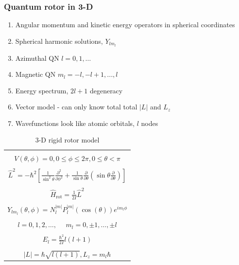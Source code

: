 \documentclass[11pt]{article}
\begin{document}
\subsubsection{Quantum rotor in 3-D}
\label{sec:org6f3d04d}
\begin{enumerate}
\item Angular momentum and kinetic energy operators in spherical coordinates
\item Spherical harmonic solutions, \(Y_{lm_l}\)
\item Azimuthal QN \(l=0, 1, \ldots\)
\item Magnetic QN \(m_l = -l, -l+1, ..., l\)
\item Energy spectrum, \(2 l + 1\) degeneracy
\item Vector model - can only know total total \(|L|\) and \(L_z\)
\item Wavefunctions look like atomic orbitals, \(l\) nodes
\end{enumerate}


\newpage
\begin{table}
   \begin{center}
   \caption{3-D rigid rotor model}
    \label{3-D Rigid rotor}
\begin{tabular}[h]{|c|}
\hline
 \\
$\displaystyle       V(\theta,\phi) = 0, 0 \leq \phi \leq 2\pi, 0 \leq \theta <
\pi$ \\
 \\
$\displaystyle     \hat L^2 = -\hbar^2 \left [
  \frac{1}{\sin^2\theta}\frac{\partial^2}{\partial \phi^2}+\frac{1}{\sin
    \theta}\frac{\partial}{\partial \theta}\left ( \sin \theta
    \frac{\partial}{\partial \theta}\right ) \right ] $ \\
\\
$\displaystyle \hat H_\text{rot} = \frac{1}{2 I} \hat L^2$ \\
\\
$\displaystyle     Y_{lm_l}(\theta,\phi)=N_l^{|m|}P_l^{|m|}(\cos(\theta))e^{im_l\phi}$ \\
\\
$\displaystyle l = 0, 1, 2, \ldots, \ \ \ \ \ \ m_l = 0,\pm 1, \ldots, \pm l$
\\
\\
$\displaystyle     E_{l}=\frac{\hbar^2}{2 I}l(l+1)$ \\
 \\
$\displaystyle |L| = \hbar \sqrt{l(l+1)}, L_z = m_l \hbar $ \\
\hline
\end{tabular}
 \end{center}
\end{table}
\end{document}
